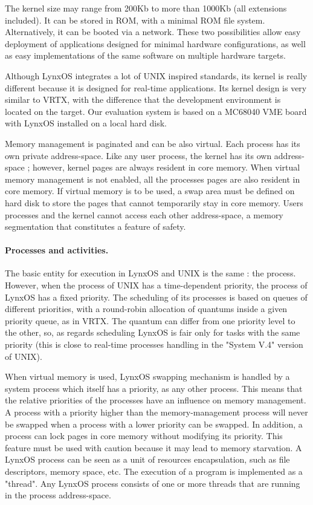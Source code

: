 \documentclass[10pt]{report}
\begin{document}
The kernel size may range from 200Kb to more than 1000Kb (all 
extensions included). It can be stored in ROM, with a minimal ROM
file system. Alternatively, it can be booted via a network. These two
possibilities allow easy deployment of applications designed for minimal 
hardware configurations, as well as easy implementations of the
same software on multiple hardware targets.

Although LynxOS integrates a lot of UNIX inspired standards, its
kernel is really different because it is designed for real-time
applications. Its kernel design is very similar to VRTX, with the
difference that the development environment is located on the
target. Our evaluation system is based on a MC68040 VME board
with LynxOS installed on a local hard disk.

Memory management is paginated and can be also virtual. Each
process has its own private address-space. Like any user
process, the kernel has its own address-space ; however, kernel pages
are always resident in core memory. When virtual memory
management is not enabled, all the processes pages are also resident in
core memory. If virtual memory is to be used, a swap area must be defined 
on hard disk to store the pages that cannot temporarily stay in 
core memory. Users processes and the kernel cannot access 
each other address-space, a memory segmentation that constitutes a
feature of safety.

\paragraph{Processes and activities.} The basic entity for execution in LynxOS and UNIX is the same : the process. However, when
the process of UNIX has a time-dependent priority, the process of LynxOS has a fixed priority. The scheduling of its processes is
based on queues of different priorities, with a round-robin allocation of quantums inside a given priority queue, as in VRTX.
The quantum can differ from one priority level to the other, so, as regards scheduling LynxOS is fair only for tasks with the same
priority (this is close to real-time processes handling in the "System V.4" version of UNIX).

When virtual memory is used, LynxOS swapping mechanism is handled by a system process which itself has a priority,
as any other process. This means that the relative priorities of the processes have an influence on memory management. A process with 
a priority higher than the memory-management process will never be swapped when a process with a lower priority can be swapped.
In addition, a process can lock pages in core memory without modifying its priority. This feature must be used with
caution because it may lead to memory starvation. A LynxOS process can be seen as a unit of resources encapsulation, such
as file descriptors, memory space, etc. The execution of a program is implemented as a "thread". Any LynxOS process consists of
one or more threads that are running in the process address-space.
\end{document}
